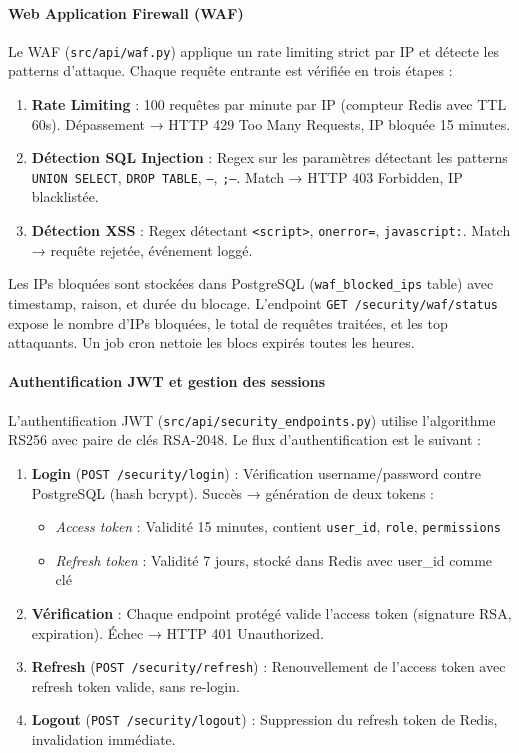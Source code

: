 \paragraph{Web Application Firewall (WAF)}

Le WAF (\texttt{src/api/waf.py}) applique un rate limiting strict par IP et détecte les patterns d'attaque. Chaque requête entrante est vérifiée en trois étapes :

\begin{enumerate}
    \item \textbf{Rate Limiting} : 100 requêtes par minute par IP (compteur Redis avec TTL 60s). Dépassement → HTTP 429 Too Many Requests, IP bloquée 15 minutes.
    \item \textbf{Détection SQL Injection} : Regex sur les paramètres détectant les patterns \texttt{UNION SELECT}, \texttt{DROP TABLE}, \texttt{--}, \texttt{;--}. Match → HTTP 403 Forbidden, IP blacklistée.
    \item \textbf{Détection XSS} : Regex détectant \texttt{<script>}, \texttt{onerror=}, \texttt{javascript:}. Match → requête rejetée, événement loggé.
\end{enumerate}

Les IPs bloquées sont stockées dans PostgreSQL (\texttt{waf\_blocked\_ips} table) avec timestamp, raison, et durée du blocage. L'endpoint \texttt{GET /security/waf/status} expose le nombre d'IPs bloquées, le total de requêtes traitées, et les top attaquants. Un job cron nettoie les blocs expirés toutes les heures.

\paragraph{Authentification JWT et gestion des sessions}

L'authentification JWT (\texttt{src/api/security\_endpoints.py}) utilise l'algorithme RS256 avec paire de clés RSA-2048. Le flux d'authentification est le suivant :

\begin{enumerate}
    \item \textbf{Login} (\texttt{POST /security/login}) : Vérification username/password contre PostgreSQL (hash bcrypt). Succès → génération de deux tokens :
    \begin{itemize}
        \item \textit{Access token} : Validité 15 minutes, contient \texttt{user\_id}, \texttt{role}, \texttt{permissions}
        \item \textit{Refresh token} : Validité 7 jours, stocké dans Redis avec user\_id comme clé
    \end{itemize}
    \item \textbf{Vérification} : Chaque endpoint protégé valide l'access token (signature RSA, expiration). Échec → HTTP 401 Unauthorized.
    \item \textbf{Refresh} (\texttt{POST /security/refresh}) : Renouvellement de l'access token avec refresh token valide, sans re-login.
    \item \textbf{Logout} (\texttt{POST /security/logout}) : Suppression du refresh token de Redis, invalidation immédiate.
\end{enumerate}

